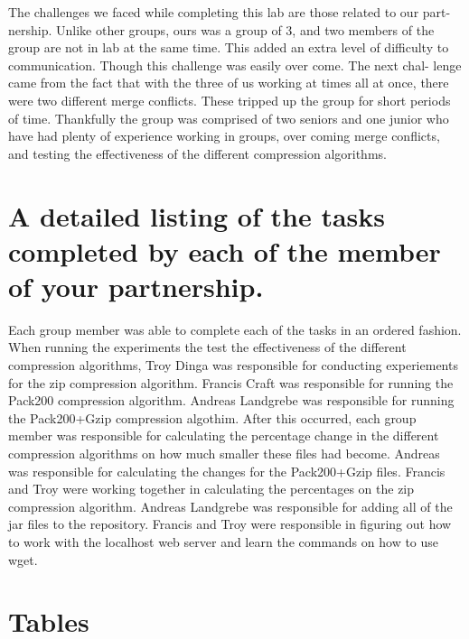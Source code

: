 \documentclass{article}
\begin{document}
The challenges we faced while completing this lab are those related to our part- nership. Unlike other groups, ours was a group of 3, and two members of the group are not in lab at the same time. This added an extra level of difficulty to communication. Though this challenge was easily over come. The next chal- lenge came from the fact that with the three of us working at times all at once, there were two different merge conflicts. These tripped up the group for short periods of time. Thankfully the group was comprised of two seniors and one junior who have had plenty of experience working in groups, over coming merge conflicts, and testing the effectiveness of the different compression algorithms.


\section{A detailed listing of the tasks completed by each of the member of your partnership.}

Each group member was able to complete each of the tasks in an ordered fashion. When running the experiments the test the effectiveness of the different compression algorithms, Troy Dinga was responsible for conducting experiements for the zip compression algorithm. Francis Craft was responsible for running the Pack200 compression algorithm. Andreas Landgrebe was responsible for running the Pack200+Gzip compression algothim. After this occurred, each group member was responsible for calculating the percentage change in the different compression algorithms on how much smaller these files had become. Andreas was responsible for calculating the changes for the Pack200+Gzip files. Francis and Troy were working together in calculating the percentages on the zip compression algorithm. Andreas Landgrebe was responsible for adding all of the jar files to the repository. Francis and Troy were responsible in figuring out how to work with the localhost web server and learn the commands on how to use wget. 

\section{Tables}
\end{document}
